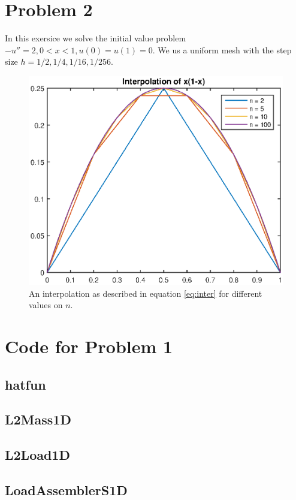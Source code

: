 \documentclass[11pt]{article}
\begin{document}
\section{Problem 2}
In this exersice we solve the initial value problem $-u'' = 2,0<x<1,u(0)=u(1)=0$. We us a uniform mesh with the step size $h = 1/2, 1/4, 1/16, 1/256$. 
\begin{figure}[H]
	\centering
	\includegraphics[width=1\textwidth]{../ex1/inter}
	\caption{An interpolation as described in equation \ref{eq:inter} for different values on $n$.}
	\label{fig:inter}
\end{figure}





\appendix
\section{Code for Problem 1}
\subsection{hatfun}\label{code:hatfun}

\subsection{L2Mass1D}\label{code:L2Mass1D}

\subsection{L2Load1D}\label{code:L2Load1D}

\subsection{LoadAssemblerS1D}\label{code:LoadAssemblerS1D}
\end{document}
